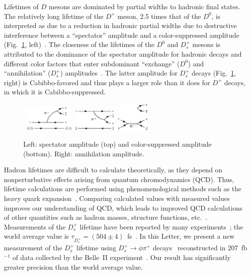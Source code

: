 \documentclass[aps,prl,twocolumn,superscriptaddress,showpacs,preprintnumbers,amsmath,amssymb]{revtex4-2}
\def\ra{\!\rightarrow\!}
\def\Dsphipi{D^+_s\ra\phi\pi^+}
\begin{document}
Lifetimes of $D$ mesons are dominated
by partial widths to hadronic final states.
The relatively long lifetime of the $D^+$ meson, 
2.5 times that of the $D^0$, is interpreted as due to 
a reduction in hadronic partial widths due to
destructive interference between a ``spectator'' amplitude 
and a color-suppressed amplitude
(Fig.~\ref{fig:Dfeynman}, left)~\cite{Morrison:1989xq}. The 
closeness of the lifetimes of
the $D^0$ and $D^+_s$ mesons is attributed to the dominance of the spectator 
amplitude for hadronic decays and different color factors that enter subdominant 
``exchange'' ($D^0$) and ``annihilation'' ($D^+_s$) amplitudes~\cite{Browder:1996af}.
The latter amplitude for $D^+_s$ decays (Fig.~\ref{fig:Dfeynman}, right)
is Cabibbo-favored and thus plays a larger role than it does for $D^+$ 
decays, in which it is Cabibbo-suppressed.

\begin{figure}[ht]
\hbox{\hskip-0.80in
\vbox{
    \includegraphics[width=0.22\textwidth]{Dspectator.eps}
\vskip0.30in
    \includegraphics[width=0.19\textwidth]{Dcolorsupp.eps}
}
\hskip-1.8in
\vbox{
    \includegraphics[width=0.15\textwidth]{Dannihil.eps}
\vskip0.5in
}
}
    \caption{Left: spectator amplitude (top) and color-suppressed amplitude (bottom). 
            Right: annihilation amplitude.}
    \label{fig:Dfeynman}
\end{figure}


Hadron lifetimes are difficult to calculate theoretically, as they depend on nonperturbative effects arising from quantum chromodynamics
(QCD). Thus, lifetime calculations are performed using phenomenological
methods such as the heavy quark 
expansion~\cite{Lenz:2014jha,Neubert:1997gu,Uraltsev:2000qw,PhysRevD.88.034004,Kirk:2017juj,Gratrex:2022xpm}.
Comparing calculated values with measured values improves our understanding of 
QCD, which leads to improved 
QCD calculations of other quantities such as hadron masses,
structure functions, etc.~\cite{FlavourLatticeAveragingGroupFLAG:2021npn}.
Measurements of the $D_s^+$ lifetime have been reported by many
experiments~\cite{LHCb:2017knt,FOCUS:2005gui,SELEX:2001miq,E791:1998zjs,CLEO:1999xvl,E687:1993lxk,TaggedPhotonSpectrometer:1987poq};
the world average value is 
$\tau^{}_{D^+_s} = (504\pm 4)$~fs~\cite{ParticleDataGroup:2022pth}.
In this Letter, we present a new measurement of the $D^+_s$ lifetime using 
$\Dsphipi$ decays~\cite{charge-conjugates} reconstructed in 207~fb$^{-1}$ 
of data collected by the Belle~II experiment~\cite{Abe:2010gxa,Kou:2018nap}.
Our result has significantly greater precision than the world average value.
\end{document}
